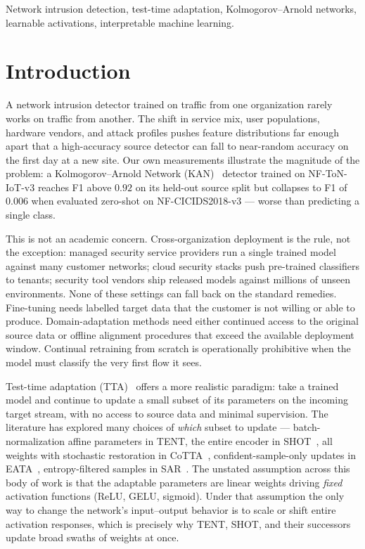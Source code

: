 \documentclass[10pt, conference, letterpaper]{IEEEtran}
\begin{document}
\begin{IEEEkeywords}
Network intrusion detection, test-time adaptation, Kolmogorov--Arnold networks, learnable activations, interpretable machine learning.
\end{IEEEkeywords}


\section{Introduction}
\label{sec:intro}

A network intrusion detector trained on traffic from one organization rarely works on traffic from another. The shift in service mix, user populations, hardware vendors, and attack profiles pushes feature distributions far enough apart that a high-accuracy source detector can fall to near-random accuracy on the first day at a new site. Our own measurements illustrate the magnitude of the problem: a Kolmogorov--Arnold Network (KAN)~\cite{liu2024kan} detector trained on NF-ToN-IoT-v3 reaches F1 above $0.92$ on its held-out source split but collapses to F1 of $0.006$ when evaluated zero-shot on NF-CICIDS2018-v3 --- worse than predicting a single class.

This is not an academic concern. Cross-organization deployment is the rule, not the exception: managed security service providers run a single trained model against many customer networks; cloud security stacks push pre-trained classifiers to tenants; security tool vendors ship released models against millions of unseen environments. None of these settings can fall back on the standard remedies. Fine-tuning needs labelled target data that the customer is not willing or able to produce. Domain-adaptation methods need either continued access to the original source data or offline alignment procedures that exceed the available deployment window. Continual retraining from scratch is operationally prohibitive when the model must classify the very first flow it sees.

Test-time adaptation (TTA)~\cite{wang2021tent} offers a more realistic paradigm: take a trained model and continue to update a small subset of its parameters on the incoming target stream, with no access to source data and minimal supervision. The literature has explored many choices of \emph{which} subset to update --- batch-normalization affine parameters in TENT, the entire encoder in SHOT~\cite{liang2020shot}, all weights with stochastic restoration in CoTTA~\cite{wang2022cotta}, confident-sample-only updates in EATA~\cite{niu2022efficient}, entropy-filtered samples in SAR~\cite{niu2023sar}. The unstated assumption across this body of work is that the adaptable parameters are linear weights driving \emph{fixed} activation functions (ReLU, GELU, sigmoid). Under that assumption the only way to change the network's input--output behavior is to scale or shift entire activation responses, which is precisely why TENT, SHOT, and their successors update broad swaths of weights at once.
\end{document}
